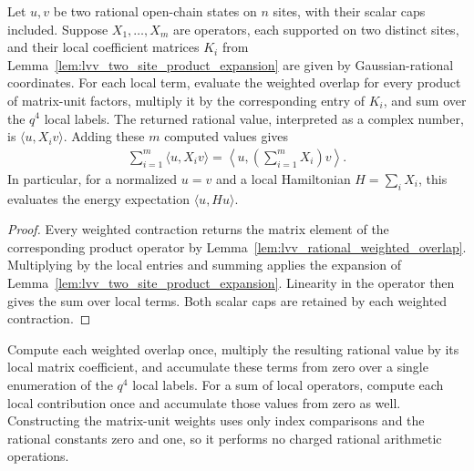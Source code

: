 \begin{lemma}
    \label{lem:lvv_rational_local_matrix_elements}
    \leanok
    Let $u,v$ be two rational open-chain states on $n$ sites, with their
    scalar caps included. Suppose $X_1,\ldots,X_m$ are operators, each
    supported on two distinct sites, and their local coefficient
    matrices $K_i$ from
    Lemma~\ref{lem:lvv_two_site_product_expansion} are given by
    Gaussian-rational coordinates.
    For each local term, evaluate the weighted overlap for every
    product of matrix-unit factors, multiply it by the corresponding
    entry of $K_i$, and sum over the $q^4$ local labels.
    The returned rational value, interpreted as a complex number, is
    $\langle u,X_iv\rangle$.
    Adding these $m$ computed values gives
    \begin{align*}
        \sum_{i=1}^m\langle u,X_iv\rangle
        =\left\langle u,\left(\sum_{i=1}^m X_i\right)v\right\rangle.
    \end{align*}
    In particular, for a normalized $u=v$ and a local Hamiltonian
    $H=\sum_iX_i$, this evaluates the energy expectation
    $\langle u,Hu\rangle$.
\end{lemma}
\begin{proof}\leanok
    Every weighted contraction returns the matrix element of the
    corresponding product operator by
    Lemma~\ref{lem:lvv_rational_weighted_overlap}.
    Multiplying by the local entries and summing applies the expansion
    of Lemma~\ref{lem:lvv_two_site_product_expansion}.
    Linearity in the operator then gives the sum over local terms.
    Both scalar caps are retained by each weighted contraction.
\end{proof}

\begin{definition}
    \label{def:lvv_local_matrix_element_count}
    \leanok
    Compute each weighted overlap once, multiply the resulting rational
    value by its local matrix coefficient, and accumulate these terms
    from zero over a single enumeration of the $q^4$ local labels.
    For a sum of local operators, compute each local contribution once
    and accumulate those values from zero as well.
    Constructing the matrix-unit weights uses only index comparisons
    and the rational constants zero and one, so it performs no charged
    rational arithmetic operations.
\end{definition}


